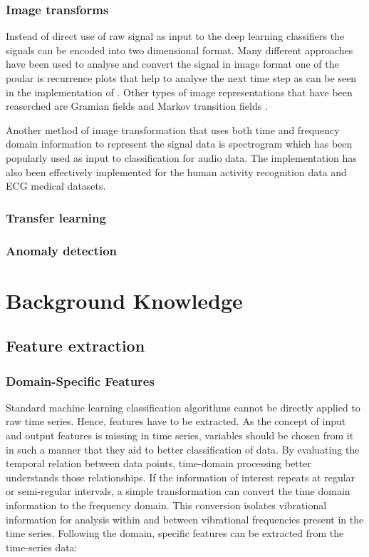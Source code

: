      
      \subsection{Image transforms}
      Instead of direct use of raw signal as input to the deep learning classifiers the signals can be encoded into two dimensional format. Many different approaches have been used to analyse and convert the signal in image format one of the poular is recurrence plots that help to analyse the next time step as can be seen in the implementation of \cite{thanaraj2020implementation}. Other types of image representations that have been reaserched are Gramian fields and  Markov transition fields \cite{wang2015imaging}.
      
      Another method of image transformation that uses both time and frequency domain information to represent the signal data is spectrogram which has been popularly used as input to classification for audio data. The implementation has also been effectively implemented for the human activity recognition data and ECG medical datasets.
      

   \subsection{Transfer learning}
  
  
  
  
 \subsection{Anomaly detection } 
  
  
  
    
    \chapter{Background Knowledge}
     \section{Feature extraction}
  
        \subsection{Domain-Specific Features}
     Standard machine learning classification algorithms cannot be directly applied to raw time series. Hence, features have to be extracted. As the concept of input and output features is missing in time series, variables should be chosen from it in such a manner that they aid to better classification of data. By evaluating the temporal relation between data points, time-domain processing better understands those relationships. If the information of interest repeats at regular or semi-regular intervals, a simple transformation can convert the time domain information to the frequency domain. This conversion isolates vibrational information for analysis within and between vibrational frequencies present in the time series. Following the domain, specific features can be extracted from the time-series data:
        
